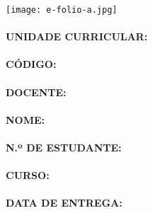 \texttt{[image: e-folio-a.jpg]}

\paragraph{\textbf{UNIDADE CURRICULAR:}} \UC

\paragraph{\textbf{CÓDIGO:}} \codigoUC

\paragraph{\textbf{DOCENTE:}} \docentes

\paragraph{\textbf{NOME:}} \theauthor

\paragraph{\textbf{N.º DE ESTUDANTE:}} \numeroEstudante

\paragraph{\textbf{CURSO:}} \curso

\paragraph{\textbf{DATA DE ENTREGA:}} \thedate
